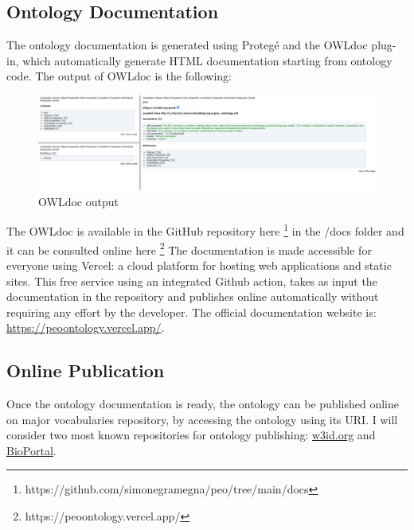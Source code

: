 \subsection{Ontology Documentation}
\label{subsection:4_5_2_docs}
The ontology documentation is generated using Protegé and the OWLdoc plug-in, which automatically generate HTML documentation starting from ontology code.
The output of OWLdoc is the following:
\begin{figure}[H]
    \centering
    \includegraphics[width=0.9\linewidth]{Figures/fig_63.png}
    \caption{OWLdoc output}
    \label{fig:enter-label}
\end{figure}
The OWLdoc is available in the GitHub repository here \footnote{https://github.com/simonegramegna/peo/tree/main/docs} in the /docs folder and it can be consulted online here \footnote{https://peoontology.vercel.app/}
The documentation is made accessible for everyone using Vercel: a cloud platform for hosting web applications and static sites.
This free service using an integrated Github action, takes as input the documentation in the repository and publishes online automatically without requiring any effort by the developer.
The official documentation website is:
\href{https://peoontology.vercel.app/}{https://peoontology.vercel.app/}.

\subsection{Online Publication}
\label{subsection:4_5_3_publication}
Once the ontology documentation is ready, the ontology can be published online on major vocabularies repository, by accessing the ontology using its URI. I will consider two most known repositories for ontology publishing: \href{https://w3id.org/}{w3id.org} and \href{https://bioportal.bioontology.org/}{BioPortal}.

